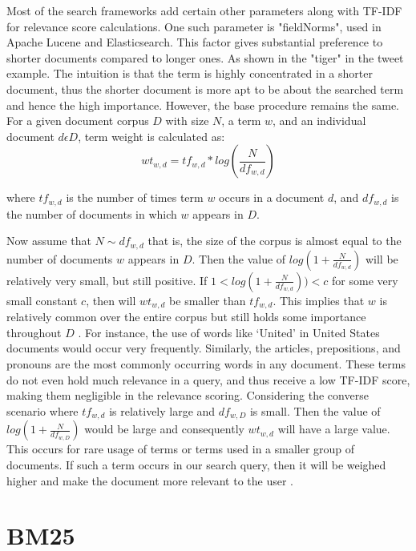 Most of the search frameworks add certain other parameters along with TF-IDF for relevance score calculations. One such parameter is "fieldNorms", used in Apache Lucene and Elasticsearch. This factor gives substantial preference to shorter documents compared to longer ones. As shown in the "tiger" in the tweet example. The intuition is that the term is highly concentrated in a shorter document, thus the shorter document is more apt to be about the searched term and hence the high importance. However, the base procedure remains the same. For a given document corpus $D$ with size $N$, a term $w$, and an individual document $d \epsilon D$, term weight is calculated as:
\begin{equation} \label{eq:2.1}
        wt_{w,d} = tf_{w,d}*log(\frac{N}{df_{w,d}})   
\end{equation}  

where $tf_{w,d}$ is the number of times term $w$ occurs in a document $d$, and  $df_{w,d}$ is the number of documents in which $w$ appears in $D$.

Now assume that $N \mathtt{\sim} df_{w,d}$ that is, the size of the corpus is almost equal to the number of documents $w$ appears in $D$. Then the value of $log(1+\frac{N}{df_{w,d}})$ will be relatively very small, but still positive. 
If  $ 1 < log(1+\frac{N}{df_{w,d}})) < c $ for some very small constant $c$, then will $wt_{w,d}$ be smaller than  $tf_{w,d}$. This implies that $w$ is relatively common over the entire corpus but still holds some importance throughout $D$ \cite{RN15}.  For instance, the use of words like ‘United’ in United States documents would occur very frequently. Similarly, the articles, prepositions, and pronouns are the most commonly occurring words in any document. These terms do not even hold much relevance in a query, and thus receive a low TF-IDF score, making them negligible in the relevance scoring. 
Considering the converse scenario where $tf_{w,d}$ is relatively large and  $df_{w,D}$ is small. Then the value of $log(1+\frac{N}{df_{w,D}})$  would be large and consequently $wt_{w,d}$ will have a large value. This occurs for rare usage of terms or terms used in a smaller group of documents. If such a term occurs in our search query, then it will be weighed higher and make the document more relevant to the user \cite{RN15}.  

\section{BM25}

